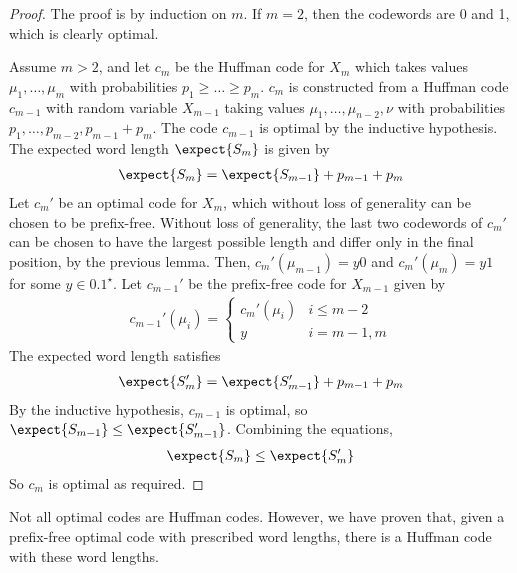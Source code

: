\begin{proof}
    The proof is by induction on $m$.
    If $m = 2$, then the codewords are 0 and 1, which is clearly optimal.

    Assume $m > 2$, and let $c_m$ be the Huffman code for $X_m$ which takes values $\mu_1, \dots, \mu_m$ with probabilities $p_1 \geq \dots \geq p_m$.
    $c_m$ is constructed from a Huffman code $c_{m-1}$ with random variable $X_{m-1}$ taking values $\mu_1, \dots, \mu_{n-2}, \nu$ with probabilities $p_1, \dots, p_{m-2}, p_{m-1} + p_m$.
    The code $c_{m-1}$ is optimal by the inductive hypothesis.
    The expected word length $\expect{S_m}$ is given by
    \begin{align*}
        \expect{S_m} = \expect{S_{m-1}} + p_{m-1} + p_m
    \end{align*}
    Let $c_m'$ be an optimal code for $X_m$, which without loss of generality can be chosen to be prefix-free.
    Without loss of generality, the last two codewords of $c_m'$ can be chosen to have the largest possible length and differ only in the final position, by the previous lemma.
    Then, $c_m'(\mu_{m-1}) = y 0$ and $c_m'(\mu_m) = y 1$ for some $y \in \qty{0,1}^\star$.
    Let $c_{m-1}'$ be the prefix-free code for $X_{m-1}$ given by
    \begin{align*}
        c_{m-1}'(\mu_i) = \begin{cases}
        c_m'(\mu_i) & i \leq m-2 \\
        y & i = m-1, m
    \end{cases}
    \end{align*}
    The expected word length satisfies
    \begin{align*}
        \expect{S_m'} = \expect{S_{m-1}'} + p_{m-1} + p_m
    \end{align*}
    By the inductive hypothesis, $c_{m-1}$ is optimal, so $\expect{S_{m-1}} \leq \expect{S_{m-1}'}$.
    Combining the equations,
    \begin{align*}
        \expect{S_m} \leq \expect{S_m'}
    \end{align*}
    So $c_m$ is optimal as required.
\end{proof}

\begin{remark}
    Not all optimal codes are Huffman codes.
    However, we have proven that, given a prefix-free optimal code with prescribed word lengths, there is a Huffman code with these word lengths.
\end{remark}

